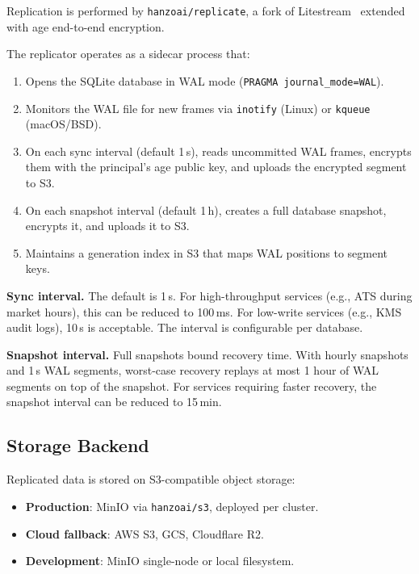 Replication is performed by \texttt{hanzoai/replicate}, a fork of
Litestream~\cite{litestream} extended with age end-to-end encryption.

\begin{definition}\label{def:wal}
The replicator operates as a sidecar process that:
\begin{enumerate}[nosep]
  \item Opens the SQLite database in WAL mode
    (\texttt{PRAGMA journal\_mode=WAL}).
  \item Monitors the WAL file for new frames via \texttt{inotify}
    (Linux) or \texttt{kqueue} (macOS/BSD).
  \item On each sync interval (default 1\,s), reads uncommitted WAL
    frames, encrypts them with the principal's age public key, and
    uploads the encrypted segment to S3.
  \item On each snapshot interval (default 1\,h), creates a full
    database snapshot, encrypts it, and uploads it to S3.
  \item Maintains a generation index in S3 that maps WAL positions
    to segment keys.
\end{enumerate}
\end{definition}

\noindent\textbf{Sync interval.} The default is 1\,s. For
high-throughput services (e.g., ATS during market hours), this can be
reduced to 100\,ms. For low-write services (e.g., KMS audit logs),
10\,s is acceptable. The interval is configurable per database.

\noindent\textbf{Snapshot interval.} Full snapshots bound recovery
time. With hourly snapshots and 1\,s WAL segments, worst-case recovery
replays at most 1 hour of WAL segments on top of the snapshot. For
services requiring faster recovery, the snapshot interval can be
reduced to 15\,min.

\subsection{Storage Backend}\label{sec:storage}

Replicated data is stored on S3-compatible object storage:

\begin{itemize}[nosep]
  \item \textbf{Production}: MinIO via \texttt{hanzoai/s3}, deployed
    per cluster.
  \item \textbf{Cloud fallback}: AWS S3, GCS, Cloudflare R2.
  \item \textbf{Development}: MinIO single-node or local filesystem.
\end{itemize}

